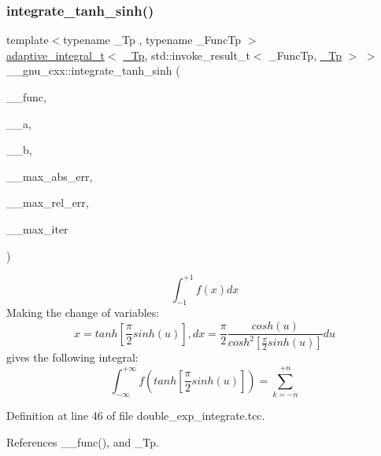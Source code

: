 \mbox{\label{namespace____gnu__cxx_a814fe9e5540142d7cfd6513247b73ab5}} 
\subsubsection{\texorpdfstring{integrate\+\_\+tanh\+\_\+sinh()}{integrate\_tanh\_sinh()}}
{\footnotesize\ttfamily template$<$typename \+\_\+\+Tp , typename \+\_\+\+Func\+Tp $>$ \\
\hyperlink{struct____gnu__cxx_1_1adaptive__integral__t}{adaptive\+\_\+integral\+\_\+t}$<$ \hyperlink{namespace____gnu__cxx_a3b19a9c800ca194374ef9172290f7d79}{\+\_\+\+Tp}, std\+::invoke\+\_\+result\+\_\+t$<$ \+\_\+\+Func\+Tp, \hyperlink{namespace____gnu__cxx_a3b19a9c800ca194374ef9172290f7d79}{\+\_\+\+Tp} $>$ $>$ \+\_\+\+\_\+gnu\+\_\+cxx\+::integrate\+\_\+tanh\+\_\+sinh (\begin{DoxyParamCaption}\item[{\+\_\+\+Func\+Tp}]{\+\_\+\+\_\+func,  }\item[{\hyperlink{namespace____gnu__cxx_a3b19a9c800ca194374ef9172290f7d79}{\+\_\+\+Tp}}]{\+\_\+\+\_\+a,  }\item[{\hyperlink{namespace____gnu__cxx_a3b19a9c800ca194374ef9172290f7d79}{\+\_\+\+Tp}}]{\+\_\+\+\_\+b,  }\item[{\hyperlink{namespace____gnu__cxx_a3b19a9c800ca194374ef9172290f7d79}{\+\_\+\+Tp}}]{\+\_\+\+\_\+max\+\_\+abs\+\_\+err,  }\item[{\hyperlink{namespace____gnu__cxx_a3b19a9c800ca194374ef9172290f7d79}{\+\_\+\+Tp}}]{\+\_\+\+\_\+max\+\_\+rel\+\_\+err,  }\item[{int}]{\+\_\+\+\_\+max\+\_\+iter }\end{DoxyParamCaption})}

\[ \int_{-1}^{+1}f(x)dx \] Making the change of variables\+: \[ x = tanh\left[\frac{\pi}{2}sinh(u)\right], dx = \frac{\pi}{2} \frac{cosh(u)}{cosh^2\left[\frac{\pi}{2}sinh(u)\right]}du \] gives the following integral\+: \[ \int_{-\infty}^{+\infty}f(tanh\left[\frac{\pi}{2}sinh(u)\right]) = \sum_{k=-n}^{+n} \] 

Definition at line 46 of file double\+\_\+exp\+\_\+integrate.\+tcc.



References \+\_\+\+\_\+func(), and \+\_\+\+Tp.



